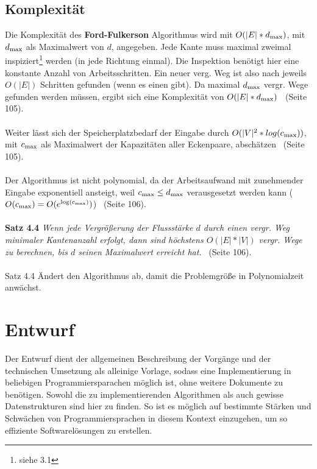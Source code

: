 \documentclass[11pt]{article}
\begin{document}
    \subsection{Komplexit\"at}
    Die Komplexit\"at des \textbf{Ford-Fulkerson} Algorithmus wird mit $O(|E| * d\textsubscript{max})$, mit $d\textsubscript{max}$ als Maximalwert von $d$, angegeben. Jede Kante muss maximal zweimal inspiziert\footnote{siehe 3.1} werden (in jede Richtung einmal). Die Inspektion ben\"otigt hier eine konstante Anzahl von Arbeitsschritten. Ein neuer verg. Weg ist also nach jeweils $O(|E|)$ Schritten gefunden (wenn es einen gibt). Da maximal $d\textsubscript{max}$ vergr. Wege gefunden werden m\"ussen, ergibt sich eine Komplexit\"at von $O(|E| * d\textsubscript{max})$~\cite{grbuch} (Seite 105).\\~\\
    Weiter l\"asst sich der Speicherplatzbedarf der Eingabe durch $O(|V|\textsuperscript{2} * log(c\textsubscript{max}))$, mit $c\textsubscript{max}$ als Maximalwert der Kapazit\"aten aller Eckenpaare, absch\"atzen~\cite{grbuch} (Seite 105).\\~\\
    Der Algorithmus ist nicht polynomial, da der Arbeitsaufwand mit zunehmender Eingabe exponentiell ansteigt, weil $c\textsubscript{max} \leq d\textsubscript{max}$ verausgesetzt werden kann ($O(c\textsubscript{max}) = O(e\textsuperscript{log(c\textsubscript{max})})$)~\cite{grbuch} (Seite 106).\\~\\
    \textbf{Satz 4.4} \textit{Wenn jede Vergr\"o\ss{}erung der Flussst\"arke $d$ durch einen vergr. Weg minimaler Kantenanzahl erfolgt, dann sind h\"ochstens $O(|E| * |V|)$ vergr. Wege zu berechnen, bis $d$ seinen Maximalwert erreicht hat.}~\cite{grbuch} (Seite 106).\\~\\
    Satz 4.4 \"Andert den Algorithmus ab, damit die Problemgr\"o\ss{}e in Polynomialzeit anw\"achst.

    \section{Entwurf}
    Der Entwurf dient der allgemeinen Beschreibung der Vorg\"ange und der technischen Umsetzung als alleinige Vorlage, sodass eine Implementierung in beliebigen Programmiersparachen m\"oglich ist, ohne weitere Dokumente zu ben\"otigen. Sowohl die zu implementierenden Algorithmen als auch gewisse Datenstrukturen sind hier zu finden. So ist es m\"oglich auf bestimmte St\"arken und Schw\"achen von Programmiersprachen in diesem Kontext einzugehen, um so effiziente Softwarel\"osungen zu erstellen.
\end{document}
